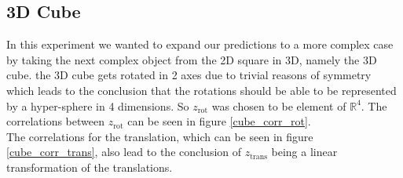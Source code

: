 \documentclass[10pt,a4paper]{article}
\newcommand{\rot}{\ensuremath{\text{rot}\xspace}}
\newcommand{\trans}{\ensuremath{\text{trans}\xspace}}
\begin{document}
\subsection{3D Cube}\label{Cube}
In this experiment we wanted to expand our predictions to a more complex case by taking the next complex object from the 2D square in 3D, namely the 3D cube. the 3D cube gets rotated in 2 axes due to trivial reasons of symmetry which leads to the conclusion that the rotations should be able to be represented by a hyper-sphere in 4 dimensions. So $z_{\rot}$ was chosen to be element of $\mathbb{R}^4$. The correlations between $z_{\rot}$ can be seen in figure \ref{cube_corr_rot}. \\
The correlations for the translation, which can be seen in figure \ref{cube_corr_trans}, also lead to the conclusion of $z_{\trans}$ being a linear transformation of the translations. 
\end{document}
